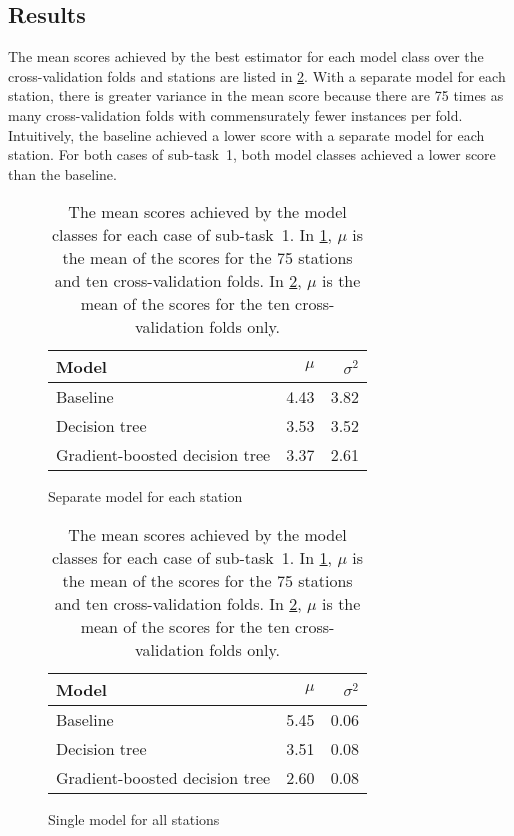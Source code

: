 \documentclass[11pt]{extarticle}
\begin{document}
\subsection{Results}
\label{sec:subtask-1:results}

The mean scores achieved by the best estimator for each model class over the
cross-validation folds and stations are listed in \cref{tab:subtask-1:results}.
With a separate model for each station, there is greater variance in the mean score
because there are 75 times as many cross-validation folds with commensurately fewer
instances per fold.
Intuitively, the baseline achieved a lower score with a separate model for each
station.
For both cases of sub-task~1, both model classes achieved a lower score than the
baseline.

\begin{table}
  \centering
  \begin{subfigure}{0.49\textwidth}
    \centering
    \begin{tabular}{lrr}
      \toprule
      Model                          & $\mu$ & $\sigma^2$
      \\
      \midrule
      Baseline                       & 4.43  & 3.82
      \\
      Decision tree                  & 3.53  & 3.52
      \\
      Gradient-boosted decision tree & 3.37  & 2.61
      \\
      \bottomrule
    \end{tabular}
    \caption{Separate model for each station}
    \label{tab:subtask-1:results-1}
  \end{subfigure}
  \begin{subfigure}{0.49\textwidth}
    \centering
    \begin{tabular}{lrr}
      \toprule
      Model                          & $\mu$ & $\sigma^2$
      \\
      \midrule
      Baseline                       & 5.45  & 0.06
      \\
      Decision tree                  & 3.51  & 0.08
      \\
      Gradient-boosted decision tree & 2.60  & 0.08
      \\
      \bottomrule
    \end{tabular}
    \caption{Single model for all stations}
    \label{tab:subtask-1:results-2}
  \end{subfigure}
  \caption{The mean scores achieved by the model classes for each case of sub-task~1.
    In \cref{tab:subtask-1:results-1}, $\mu$ is the mean of the scores for the 75 stations
    and ten cross-validation folds.
    In \cref{tab:subtask-1:results-2}, $\mu$ is the mean of the scores for the ten
    cross-validation folds only.
  }
  \label{tab:subtask-1:results}
\end{table}
\end{document}
